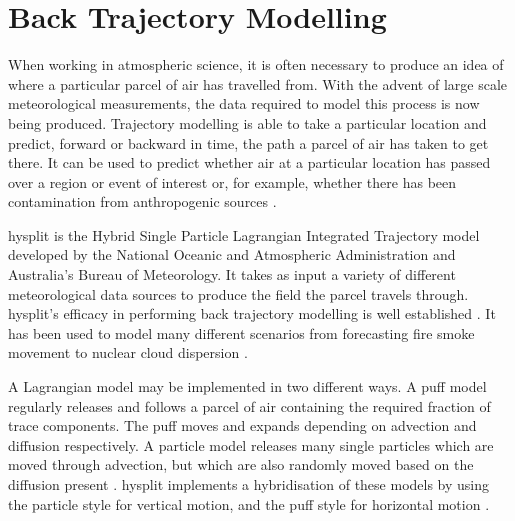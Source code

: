 




	\section{Back Trajectory Modelling}
	\label{sec:backtraj}

	When working in atmospheric science, it is often necessary to produce an idea of where a particular parcel of air has travelled from. With the advent of large scale meteorological measurements, the data required to model this process is now being produced. Trajectory modelling is able to take a particular location and predict, forward or backward in time, the path a parcel of air has taken to get there. It can be used to predict whether air at a particular location has passed over a region or event of interest or, for example, whether there has been contamination from anthropogenic sources \citep{draxler:1998vr}.

	\gls{hysplit} is the Hybrid Single Particle Lagrangian Integrated Trajectory model developed by the National Oceanic and Atmospheric Administration and Australia's Bureau of Meteorology. It takes as input a variety of different meteorological data sources to produce the field the parcel travels through. \gls{hysplit}'s efficacy in performing back trajectory modelling is well established \citep{draxler:1998vr}. It has been used to model many different scenarios from forecasting fire smoke movement \citep{rolph:2010in} to nuclear cloud dispersion \citep{rolph:2014kk}.

	A Lagrangian model may be implemented in two different ways. A puff model regularly releases and follows a parcel of air containing the required fraction of trace components. The puff moves and expands depending on advection and diffusion respectively. A particle model releases many single particles which are moved through advection, but which are also randomly moved based on the diffusion present \citep{draxler:1997tga}. \gls{hysplit} implements a hybridisation of these models by using the particle style for vertical motion, and the puff style for horizontal motion \citep{hurley:1994df}.

